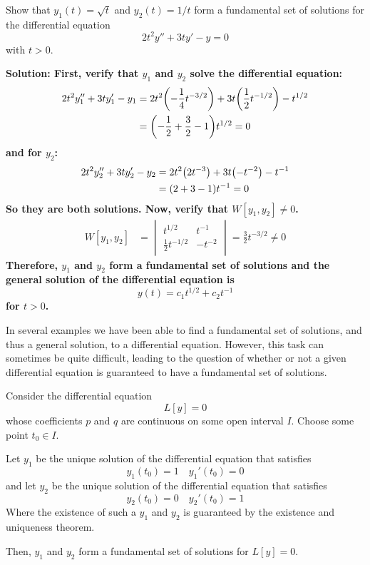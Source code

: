 \begin{example}
    Show that $y_1(t) = \sqrt{t}$ and $y_2(t) = 1/t$ form a fundamental set of solutions for the differential equation
    \[ 2t^2y'' + 3ty' - y = 0 \]
    with $t > 0$. \par
    \bf{Solution:} First, verify that $y_1$ and $y_2$ solve the differential equation:
    \begin{align*}
        2t^2 y_1'' + 3ty_1' - y_1 &= 2t^2 \pqty{-\frac{1}{4}t^{-3/2}} + 3t \pqty{ \frac{1}{2}t^{-1/2}} - t^{1/2} \\
        &= \pqty{-\frac{1}{2} + \frac{3}{2} - 1}t^{1/2} = 0
    \end{align*}
    and for $y_2$:
    \begin{align*}
        2t^2 y_2'' + 3ty_2' - y_2 &= 2t^2 \pqty{2t^{-3}} + 3t \pqty{-t^{-2}} - t^{-1} \\
        &= \pqty{2 + 3 - 1}t^{-1} = 0
    \end{align*}
    So they are both solutions. Now, verify that $W[y_1, y_2]\neq 0$. 
    \begin{align*}
        W[y_1, y_2] &= \begin{vmatrix}
            t^{1/2} & t^{-1} \\
            \frac{1}{2}t^{-1/2} & -t^{-2}
        \end{vmatrix} = \frac{3}{2}t^{-3/2} \neq 0
    \end{align*}
    Therefore, $y_1$ and $y_2$ form a fundamental set of solutions and the general solution of the differential equation is 
    \[ y(t) = c_1t^{1/2} + c_2t^{-1}\]
    for $t>0$.
\end{example}
In several examples we have been able to find a fundamental set of solutions, and thus a general solution, to a differential equation. However, this task can sometimes be quite difficult, leading to the question of whether or not a given differential equation is guaranteed to have a fundamental set of solutions. 
\begin{theorem}
    Consider the differential equation
    \[ L[y] = 0\]
    whose coefficients $p$ and $q$ are continuous on some open interval $I$. Choose some point $t_0\in I$. \par
    Let $y_1$ be the unique solution of the differential equation that satisfies 
    \[ y_1(t_0) = 1 \quad y_1'(t_0) = 0 \]
    and let $y_2$ be the unique solution of the differential equation that satisfies
    \[ y_2(t_0) = 0 \quad y_2'(t_0) = 1 \]
    Where the existence of such a $y_1$ and $y_2$ is guaranteed by the existence and uniqueness theorem. \par
    Then, $y_1$ and $y_2$ form a fundamental set of solutions for $L[y] = 0$. 
\end{theorem}
